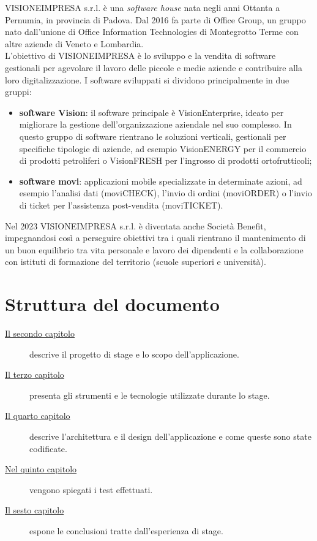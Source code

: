 VISIONEIMPRESA s.r.l. è una \textit{software house} nata negli anni Ottanta a Pernumia, in provincia di Padova. Dal 2016 fa parte di Office Group, un gruppo nato dall'unione di Office Information Technologies di Montegrotto Terme con altre aziende di Veneto e Lombardia.\\
L'obiettivo di VISIONEIMPRESA è lo sviluppo e la vendita di software gestionali per agevolare il lavoro delle piccole e medie aziende e contribuire alla loro digitalizzazione. I software sviluppati si dividono principalmente in due gruppi:
\begin{itemize}
    \item \textbf{software Vision}: il software principale è VisionEnterprise, ideato per migliorare la gestione dell'organizzazione aziendale nel suo complesso. In questo gruppo di software rientrano le soluzioni verticali, gestionali per specifiche tipologie di aziende, ad esempio VisionENERGY per il commercio di prodotti petroliferi o VisionFRESH per l'ingrosso di prodotti ortofrutticoli;
    \item \textbf{software movi}: applicazioni mobile specializzate in determinate azioni, ad esempio l'analisi dati (moviCHECK), l'invio di ordini (moviORDER) o l'invio di ticket per l'assistenza post-vendita (moviTICKET).
\end{itemize}

Nel 2023 VISIONEIMPRESA s.r.l. è diventata anche \gls{Società Benefit}\glsfirstoccur, impegnandosi così a perseguire obiettivi tra i quali rientrano il mantenimento di un buon equilibrio tra vita personale e lavoro dei dipendenti e la collaborazione con istituti di formazione del territorio (scuole superiori e università).

\section{Struttura del documento}


\begin{description} 
    \item[{\hyperref[cap:descrizione-stage]{Il secondo capitolo}}] descrive il progetto di stage e lo scopo dell'applicazione.
    
    \item[{\hyperref[cap:tecnologie-strumenti]{Il terzo capitolo}}] presenta gli strumenti e le tecnologie utilizzate durante lo stage.
    
    \item[{\hyperref[cap:progettazione-codifica]{Il quarto capitolo}}] descrive l'architettura e il design dell'applicazione e come queste sono state codificate.
    
    \item[{\hyperref[cap:verifica-validazione]{Nel quinto capitolo}}] vengono spiegati i test effettuati.
    
    \item[{\hyperref[cap:conclusioni]{Il sesto capitolo}}] espone le conclusioni tratte dall'esperienza di stage.
\end{description}
